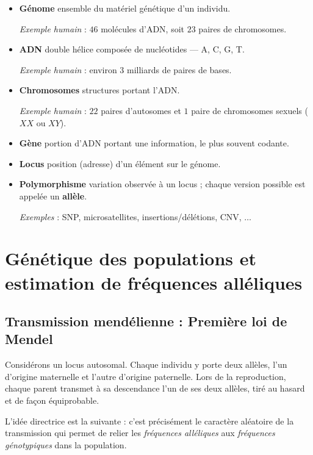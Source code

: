 \begin{mdframed}
\begin{definition}
\begin{itemize}
\item \textbf{Génome} ensemble du matériel génétique d'un individu.

\textit{Exemple humain} : $46$ molécules d'ADN, soit $23$ paires de chromosomes.
\item \textbf{ADN} double hélice composée de nucléotides — A, C, G, T. 

\textit{Exemple humain} : environ $3$ milliards de paires de bases.
\item \textbf{Chromosomes} structures portant l'ADN.

\textit{Exemple humain} : $22$ paires d'autosomes et $1$ paire de chromosomes sexuels ($XX$ ou $XY$).
\item \textbf{Gène} portion d'ADN portant une information, le plus souvent codante.
\item \textbf{Locus}  position (adresse) d'un élément sur le génome.

\item \textbf{Polymorphisme} variation observée à un locus ; chaque version possible est appelée un \textbf{allèle}. 

\textit{Exemples} : SNP, microsatellites, insertions/délétions, CNV, $\dots$
\end{itemize}
\end{definition}
\end{mdframed}

\chapter{Génétique des populations et estimation de fréquences alléliques}

\section{Transmission mendélienne : Première loi de Mendel}

Considérons un locus autosomal. Chaque individu y porte deux allèles, l'un d'origine maternelle et l'autre d'origine paternelle. Lors de la reproduction, chaque parent transmet à sa descendance l'un de ses deux allèles, tiré au hasard et de façon équiprobable.

L'idée directrice est la suivante : c'est précisément le caractère aléatoire de la transmission qui permet de relier les \textit{fréquences alléliques} aux \textit{fréquences génotypiques} dans la population.

